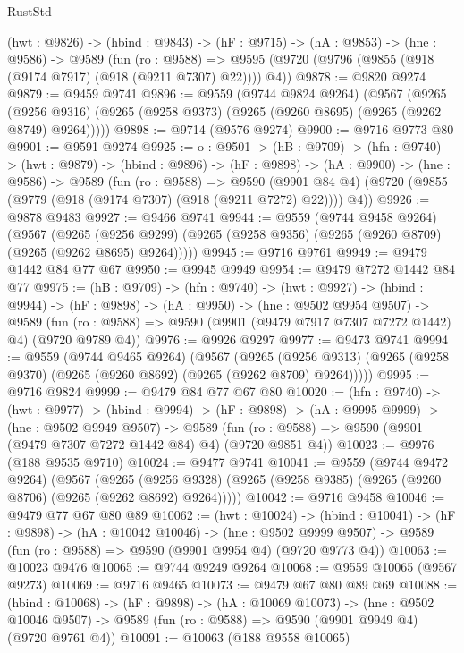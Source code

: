 \begin{lexlean}{RustStd}
\begin{coremodule}
  (hwt : @9826) ->
  (hbind : @9843) ->
  (hF : @9715) ->
  (hA : @9853) ->
  (hne : @9586) ->
  @9589
    (fun (ro : @9588) =>
    @9595 (@9720 (@9796 (@9855 (@918 (@9174 @7917) (@918 (@9211 @7307) @22)))) @4))
@9878 := @9820 @9274
@9879 := @9459 @9741
@9896 := @9559
    (@9744 @9824 @9264)
    (@9567
      (@9265 (@9256 @9316) (@9265 (@9258 @9373) (@9265 (@9260 @8695) (@9265 (@9262 @8749) @9264)))))
@9898 := @9714 (@9576 @9274)
@9900 := @9716 @9773 @80
@9901 := @9591 @9274
@9925 := {o : @9501} ->
  (hB : @9709) ->
  (hfn : @9740) ->
  (hwt : @9879) ->
  (hbind : @9896) ->
  (hF : @9898) ->
  (hA : @9900) ->
  (hne : @9586) ->
  @9589
    (fun (ro : @9588) =>
    @9590 (@9901 @84 @4) (@9720 (@9855 (@9779 (@918 (@9174 @7307) (@918 (@9211 @7272) @22)))) @4))
@9926 := @9878 @9483
@9927 := @9466 @9741
@9944 := @9559
    (@9744 @9458 @9264)
    (@9567
      (@9265 (@9256 @9299) (@9265 (@9258 @9356) (@9265 (@9260 @8709) (@9265 (@9262 @8695) @9264)))))
@9945 := @9716 @9761
@9949 := @9479 @1442 @84 @77 @67
@9950 := @9945 @9949
@9954 := @9479 @7272 @1442 @84 @77
@9975 := (hB : @9709) ->
  (hfn : @9740) ->
  (hwt : @9927) ->
  (hbind : @9944) ->
  (hF : @9898) ->
  (hA : @9950) ->
  (hne : @9502 @9954 @9507) ->
  @9589 (fun (ro : @9588) => @9590 (@9901 (@9479 @7917 @7307 @7272 @1442) @4) (@9720 @9789 @4))
@9976 := @9926 @9297
@9977 := @9473 @9741
@9994 := @9559
    (@9744 @9465 @9264)
    (@9567
      (@9265 (@9256 @9313) (@9265 (@9258 @9370) (@9265 (@9260 @8692) (@9265 (@9262 @8709) @9264)))))
@9995 := @9716 @9824
@9999 := @9479 @84 @77 @67 @80
@10020 := (hfn : @9740) ->
  (hwt : @9977) ->
  (hbind : @9994) ->
  (hF : @9898) ->
  (hA : @9995 @9999) ->
  (hne : @9502 @9949 @9507) ->
  @9589 (fun (ro : @9588) => @9590 (@9901 (@9479 @7307 @7272 @1442 @84) @4) (@9720 @9851 @4))
@10023 := @9976 (@188 @9535 @9710)
@10024 := @9477 @9741
@10041 := @9559
    (@9744 @9472 @9264)
    (@9567
      (@9265 (@9256 @9328) (@9265 (@9258 @9385) (@9265 (@9260 @8706) (@9265 (@9262 @8692) @9264)))))
@10042 := @9716 @9458
@10046 := @9479 @77 @67 @80 @89
@10062 := (hwt : @10024) ->
  (hbind : @10041) ->
  (hF : @9898) ->
  (hA : @10042 @10046) ->
  (hne : @9502 @9999 @9507) -> @9589 (fun (ro : @9588) => @9590 (@9901 @9954 @4) (@9720 @9773 @4))
@10063 := @10023 @9476
@10065 := @9744 @9249 @9264
@10068 := @9559 @10065 (@9567 @9273)
@10069 := @9716 @9465
@10073 := @9479 @67 @80 @89 @69
@10088 := (hbind : @10068) ->
  (hF : @9898) ->
  (hA : @10069 @10073) ->
  (hne : @9502 @10046 @9507) -> @9589 (fun (ro : @9588) => @9590 (@9901 @9949 @4) (@9720 @9761 @4))
@10091 := @10063 (@188 @9558 @10065)

\end{coremodule}
\end{lexlean}
